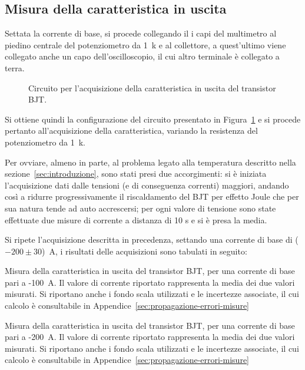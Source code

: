 \documentclass[../main.tex]{subfiles}
\begin{document}
    \subsection*{Misura della caratteristica in uscita}
    Settata la corrente di base, si procede collegando il i capi del multimetro al piedino
    centrale del potenziometro da 1~k\textohm\; e al collettore, a quest'ultimo
    viene collegato anche un capo dell'oscilloscopio, il cui altro terminale è collegato a terra.
    \begin{figure}[h!]
        \centering
        
        \caption{Circuito per l'acquisizione della caratteristica in uscita del transistor BJT.}
        \label{fig:circuito-caratteristica}
    \end{figure}
    Si ottiene quindi la configurazione del circuito presentato in Figura~\ref{fig:circuito-caratteristica}
    e si procede pertanto all'acquisizione della caratteristica, variando la
    resistenza del potenziometro da 1~k\textohm.

    Per ovviare, almeno in parte, al problema legato alla
    temperatura descritto nella sezione~\ref{sec:introduzione},
    sono stati presi due accorgimenti:
    si è iniziata l'acquisizione dati dalle tensioni (e di
    conseguenza correnti) maggiori, andando così a ridurre
    progressivamente il riscaldamento del BJT per effetto Joule
    che per sua natura tende ad auto accrescersi;
    per ogni valore di tensione sono state effettuate due
    misure di corrente a distanza di 10 s e si è presa la media.

    Si ripete l'acquisizione descritta in precedenza, settando una corrente di base
    di ($-200 \pm 30$)~\textmu A, i risultati delle acquisizioni sono tabulati in seguito:
    \clearpage
    \begin{table}[!ht]
        \centering
        
        \captionsetup{justification=centering} %
        \caption{Misura della caratteristica in uscita del transistor BJT, per una corrente di base pari a -100~\textmu A. Il
        valore di corrente riportato rappresenta la media dei due valori misurati. Si
        riportano anche i fondo scala utilizzati e le incertezze associate, il cui calcolo
        è consultabile in Appendice~\ref{sec:propagazione-errori-misure}}
        \label{tab:100uA}

    \end{table}
    \begin{table}[!ht]
        \centering
        
        \captionsetup{justification=centering} %
        \caption{Misura della caratteristica in uscita del transistor BJT, per una corrente di base pari a -200~\textmu A. Il
        valore di corrente riportato rappresenta la media dei due valori misurati. Si
        riportano anche i fondo scala utilizzati e le incertezze associate, il cui calcolo
        è consultabile in Appendice~\ref{sec:propagazione-errori-misure}}
        \label{tab:200uA}

    \end{table}
\end{document}
